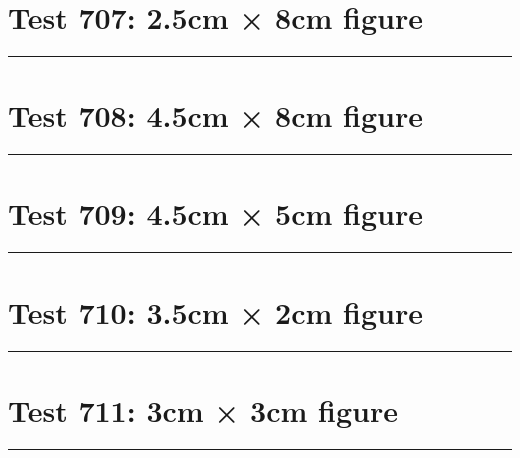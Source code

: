 \documentclass[a4paper,11pt]{article}
\begin{document}
\section*{Test 707: 2.5cm × 8cm figure}
\begin{swarmwrap}%
  \begin{minipage}[t]{2cm}
    \centering
    \rule{\linewidth}{8cm}
  \end{minipage}%
\end{swarmwrap}%
\swarmwrapnext
\lipsum[49]
\lipsum[50]
\lipsum[51]
\lipsum[52]
\section*{Test 708: 4.5cm × 8cm figure}
\begin{swarmwrap}%
  \begin{minipage}[t]{4cm}
    \centering
    \rule{\linewidth}{8cm}
  \end{minipage}%
\end{swarmwrap}%
\swarmwrapnext
\lipsum[9]
\lipsum[10]
\lipsum[11]
\lipsum[12]
\lipsum[13]
\lipsum[14]
\section*{Test 709: 4.5cm × 5cm figure}
\begin{swarmwrap}%
  \begin{minipage}[t]{4cm}
    \centering
    \rule{\linewidth}{5cm}
  \end{minipage}%
\end{swarmwrap}%
\swarmwrapnext
\lipsum[111]
\lipsum[112]
\lipsum[113]
\lipsum[114]
\lipsum[115]
\lipsum[116]
\section*{Test 710: 3.5cm × 2cm figure}
\begin{swarmwrap}%
  \begin{minipage}[t]{3cm}
    \centering
    \rule{\linewidth}{2cm}
  \end{minipage}%
\end{swarmwrap}%
\swarmwrapnext
\lipsum[54]
\lipsum[55]
\lipsum[56]
\lipsum[57]
\section*{Test 711: 3cm × 3cm figure}
\begin{swarmwrap}%
  \begin{minipage}[t]{3cm}
    \centering
    \rule{\linewidth}{3cm}
  \end{minipage}%
\end{swarmwrap}%
\swarmwrapnext
\lipsum[139]
\lipsum[140]
\lipsum[141]
\end{document}
